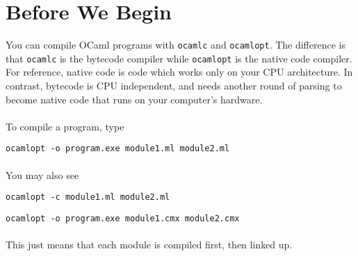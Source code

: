 \documentclass[12pt,a4paper]{article} %
\begin{document}
\section{Before We Begin}
You can compile OCaml programs with \verb|ocamlc| and \verb|ocamlopt|. The difference is that \verb|ocamlc| is the bytecode compiler while \verb|ocamlopt| is the native code compiler. For reference, native code is code which works only on your CPU architecture. In contrast, bytecode is CPU independent, and needs another round of parsing to become native code that runs on your computer's hardware.
\\\\
To compile a program, type 

\verb|ocamlopt -o program.exe module1.ml module2.ml|
\\\\
You may also see 

\verb|ocamlopt -c module1.ml module2.ml|

\verb|ocamlopt -o program.exe module1.cmx module2.cmx|
\\\\
This just means that each module is compiled first, then linked up.
\end{document}
